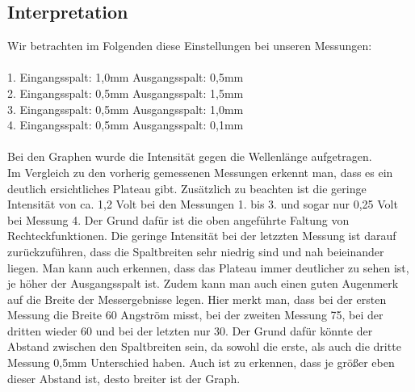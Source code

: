 \subsection {Interpretation} 
Wir betrachten im Folgenden diese Einstellungen bei unseren Messungen:\\\\
1. Eingangsspalt: 1,0mm \tab Ausgangsspalt: 0,5mm\\
2. Eingangsspalt: 0,5mm \tab Ausgangsspalt: 1,5mm\\
3. Eingangsspalt: 0,5mm \tab Ausgangsspalt: 1,0mm\\
4. Eingangsspalt: 0,5mm \tab Ausgangsspalt: 0,1mm\\
 \\
Bei den Graphen wurde die Intensit\"at gegen die Wellenl\"ange aufgetragen. \\
Im Vergleich zu den vorherig gemessenen Messungen erkennt man, dass es ein deutlich ersichtliches Plateau gibt.
Zus\"atzlich zu beachten ist die geringe Intensit\"at von ca. 1,2 Volt bei den Messungen 1. bis 3. und sogar nur 0,25 Volt bei Messung 4. Der Grund daf\"ur ist die oben angef\"uhrte Faltung von 
Rechteckfunktionen. Die geringe Intensit\"at bei der letzzten Messung ist darauf zur\"uckzuf\"uhren, dass die Spaltbreiten sehr niedrig sind und nah beieinander liegen. Man kann auch erkennen, dass das 
Plateau immer deutlicher zu sehen ist, je h\"oher der Ausgangsspalt ist. Zudem kann man auch einen guten Augenmerk auf die Breite der Messergebnisse legen. Hier merkt man, dass bei der ersten Messung die 
Breite 60 Angstr\"om misst, bei der zweiten Messung 75, bei der dritten wieder 60 und bei der letzten nur 30. Der Grund daf\"ur k\"onnte der Abstand zwischen den Spaltbreiten sein, da sowohl die erste, 
als auch die dritte Messung 0,5mm Unterschied haben. Auch ist zu erkennen, dass je gr\"o\ss{}er eben dieser Abstand ist, desto breiter ist der Graph. \\








